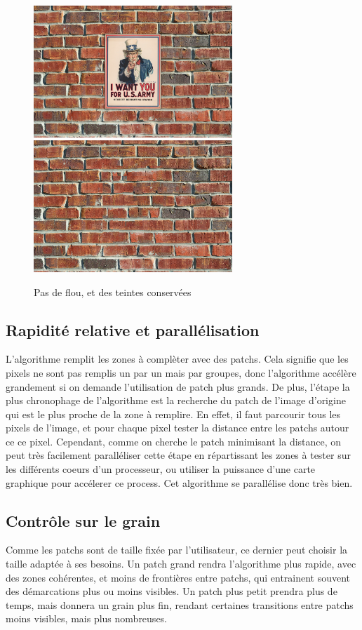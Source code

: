\begin{figure}[ht]
\centering
\includegraphics[width=7.5cm]{img/examples/wall.jpg}
\includegraphics[width=7.5cm]{img/examples/wall_res.jpg}
\caption{Pas de flou, et des teintes conservées}
\end{figure}

\subsection{Rapidité relative et parallélisation}
L'algorithme remplit les zones à complèter avec des patchs. Cela signifie que
les pixels ne sont pas remplis un par un mais par groupes, donc l'algorithme
accélère grandement si on demande l'utilisation de patch plus grands.
De plus, l'étape la plus chronophage de l'algorithme est la recherche du 
patch de l'image d'origine qui est le plus proche de la zone à remplire.
En effet, il faut parcourir tous les pixels de l'image, et pour chaque
pixel tester la distance entre les patchs autour ce ce pixel. Cependant,
comme on cherche le patch minimisant la distance, on peut très facilement
paralléliser cette étape en répartissant les zones à tester sur les 
différents coeurs d'un processeur, ou utiliser la puissance d'une carte graphique
pour accélerer ce process.
Cet algorithme se parallélise donc très bien.

\subsection{Contrôle sur le grain}
Comme les patchs sont de taille fixée par l'utilisateur, ce dernier peut choisir
la taille adaptée à ses besoins. Un patch grand rendra l'algorithme plus rapide,
avec des zones cohérentes, et moins de frontières entre patchs, qui entrainent
souvent des démarcations plus ou moins visibles. Un patch plus petit prendra
plus de temps, mais donnera un grain plus fin, rendant certaines transitions
entre patchs moins visibles, mais plus nombreuses.

